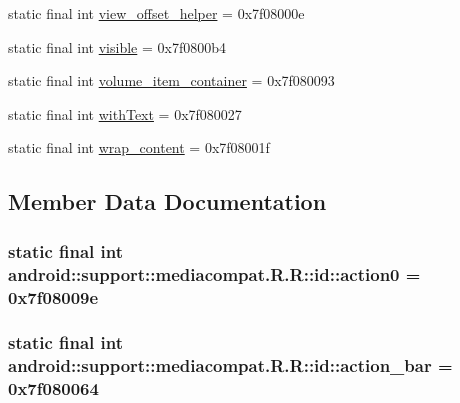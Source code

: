 \begin{CompactItemize}
\item 
static final int \hyperlink{classandroid_1_1support_1_1mediacompat_1_1_r_1_1id_733cf39731ce6dc8643402295372cbdb}{view\_\-offset\_\-helper} = 0x7f08000e
\item 
static final int \hyperlink{classandroid_1_1support_1_1mediacompat_1_1_r_1_1id_d435b817969d69379b1d42620779f126}{visible} = 0x7f0800b4
\item 
static final int \hyperlink{classandroid_1_1support_1_1mediacompat_1_1_r_1_1id_545c12699696fba3a07945f54df4d05d}{volume\_\-item\_\-container} = 0x7f080093
\item 
static final int \hyperlink{classandroid_1_1support_1_1mediacompat_1_1_r_1_1id_b6aa5f4e85a227f8a6874b0febd60967}{withText} = 0x7f080027
\item 
static final int \hyperlink{classandroid_1_1support_1_1mediacompat_1_1_r_1_1id_e497dbc2740a1ef5d7482b4b4a59ba51}{wrap\_\-content} = 0x7f08001f
\end{CompactItemize}


\subsection{Member Data Documentation}
\hypertarget{classandroid_1_1support_1_1mediacompat_1_1_r_1_1id_5a33f4d66715d1f25e4410d5ae1dbba4}{
\subsubsection[{action0}]{\setlength{\rightskip}{0pt plus 5cm}static final int android::support::mediacompat.R.R::id::action0 = 0x7f08009e}}
\label{classandroid_1_1support_1_1mediacompat_1_1_r_1_1id_5a33f4d66715d1f25e4410d5ae1dbba4}


\hypertarget{classandroid_1_1support_1_1mediacompat_1_1_r_1_1id_c7661e9f9c05fa70dc00833658ba6e44}{
\subsubsection[{action\_\-bar}]{\setlength{\rightskip}{0pt plus 5cm}static final int android::support::mediacompat.R.R::id::action\_\-bar = 0x7f080064}}
\label{classandroid_1_1support_1_1mediacompat_1_1_r_1_1id_c7661e9f9c05fa70dc00833658ba6e44}


